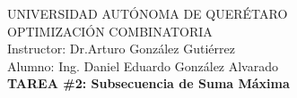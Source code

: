 \begin{center}

\LARGE
UNIVERSIDAD AUTÓNOMA DE QUERÉTARO \\
OPTIMIZACIÓN COMBINATORIA \\[0.3cm]

\Large
Instructor: Dr.Arturo González Gutiérrez \\
Alumno: Ing. Daniel Eduardo González Alvarado \\%
\large
\textbf{TAREA \#2: Subsecuencia de Suma Máxima}\\

\end{center}